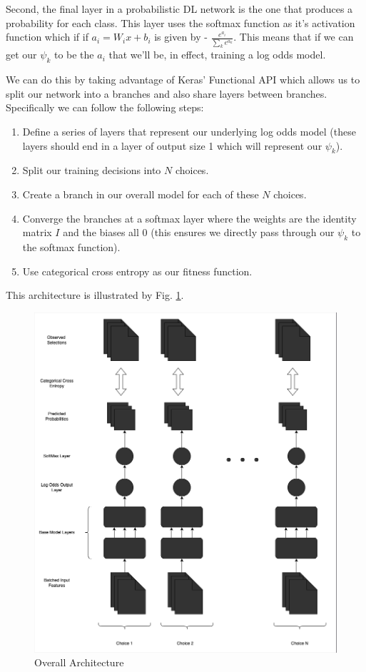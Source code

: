 \documentclass[11pt]{article}
\begin{document}
Second, the final layer in a probabilistic DL network is the one that produces a probability for each class. This layer uses the softmax function as it's activation function which if if $a_i=W_i x+b_i$ is given by - $\frac{e^{a_i}}{\sum_k e^{a_k}}$. This means that if we can get our $\psi_k$ to be the $a_i$ that we'll be, in effect, training a log odds model.

We can do this by taking advantage of Keras' Functional API \cite{kerasfunctional} which allows us to split our network into a branches and also share layers between branches. Specifically we can follow the following steps:

\begin{enumerate}
\item Define a series of layers that represent our underlying log odds model (these layers should end in a layer of output size 1 which will represent our $\psi_k$).
\item Split our training decisions into $N$ choices.
\item Create a branch in our overall model for each of these $N$ choices.
\item Converge the branches at a softmax layer where the weights are the identity matrix $I$ and the biases all 0 (this ensures we directly pass through our $\psi_k$ to the softmax function).
\item Use categorical cross entropy as our fitness function.
\end{enumerate}

This architecture is illustrated by Fig. \ref{fig:logarch}.

\begin{figure}[h!] 
  \includegraphics[width=\linewidth]{logarch.png}
  \caption{Overall Architecture}
  \label{fig:logarch}
\end{figure}
\end{document}
